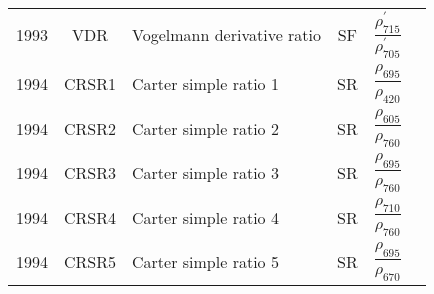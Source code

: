 \documentclass[10pt]{article}
\begin{document}
\begin{ThreePartTable}
\begin{longtable}{c c m{2.3in} c M{2.8in} M{1.5in}}
  1993 & VDR     & Vogelmann derivative ratio                                                     & SF & $\dfrac{\rho^\prime_{715}}{\rho^\prime_{705}}$                                                                                                                                                                                                                                          & \citet{Vogelmann1993}                               \\
  1994 & CRSR1   & Carter simple ratio 1                                                          & SR & $\dfrac{\rho_{695}}{\rho_{420}}$                                                                                                                                                                                                                                                        & \citet{Carter1994}                                  \\
  1994 & CRSR2   & Carter simple ratio 2                                                          & SR & $\dfrac{\rho_{605}}{\rho_{760}}$                                                                                                                                                                                                                                                        & \citet{Carter1994}                                  \\
  1994 & CRSR3   & Carter simple ratio 3                                                          & SR & $\dfrac{\rho_{695}}{\rho_{760}}$                                                                                                                                                                                                                                                        & \citet{Carter1994}                                  \\
  1994 & CRSR4   & Carter simple ratio 4                                                          & SR & $\dfrac{\rho_{710}}{\rho_{760}}$                                                                                                                                                                                                                                                        & \citet{Carter1994}                                  \\
  1994 & CRSR5   & Carter simple ratio 5                                                          & SR & $\dfrac{\rho_{695}}{\rho_{670}}$                                                                                                                                                                                                                                                        & \citet{Carter1994}                                  \\

\end{longtable}
\end{ThreePartTable}
\end{document}
